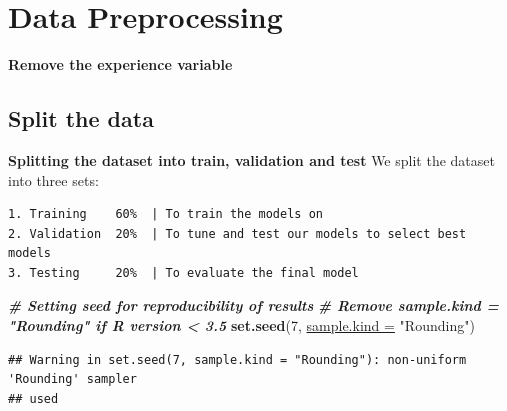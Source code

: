 \documentclass[
]{article}
\newenvironment{Shaded}{\begin{snugshade}}{\end{snugshade}}
\newcommand{\CommentTok}[1]{\textcolor[rgb]{0.00,0.40,1.00}{\textbf{\textit{#1}}}}
\newcommand{\DataTypeTok}[1]{\textcolor[rgb]{0.74,0.68,0.62}{\underline{#1}}}
\newcommand{\DecValTok}[1]{\textcolor[rgb]{0.27,0.67,0.26}{#1}}
\newcommand{\KeywordTok}[1]{\textcolor[rgb]{0.26,0.66,0.93}{\textbf{#1}}}
\newcommand{\NormalTok}[1]{\textcolor[rgb]{0.74,0.68,0.62}{#1}}
\newcommand{\OperatorTok}[1]{\textcolor[rgb]{0.74,0.68,0.62}{#1}}
\newcommand{\OtherTok}[1]{\textcolor[rgb]{0.74,0.68,0.62}{#1}}
\newcommand{\StringTok}[1]{\textcolor[rgb]{0.02,0.61,0.04}{#1}}
\begin{document}
\hypertarget{data-preprocessing}{%
\section{Data Preprocessing}\label{data-preprocessing}}

\textbf{Remove the experience variable}

\begin{Shaded}
\end{Shaded}

\hypertarget{split-the-data}{%
\subsection{Split the data}\label{split-the-data}}

\textbf{Splitting the dataset into train, validation and test} We split
the dataset into three sets:

\begin{verbatim}
1. Training    60%  | To train the models on
2. Validation  20%  | To tune and test our models to select best models
3. Testing     20%  | To evaluate the final model
\end{verbatim}

\begin{Shaded}
\begin{Highlighting}[]
\CommentTok{# Setting seed for reproducibility of results}
\CommentTok{# Remove sample.kind = "Rounding" if R version < 3.5}
\KeywordTok{set.seed}\NormalTok{(}\DecValTok{7}\NormalTok{, }\DataTypeTok{sample.kind =} \StringTok{"Rounding"}\NormalTok{)}
\end{Highlighting}
\end{Shaded}

\begin{verbatim}
## Warning in set.seed(7, sample.kind = "Rounding"): non-uniform 'Rounding' sampler
## used
\end{verbatim}
\end{document}
